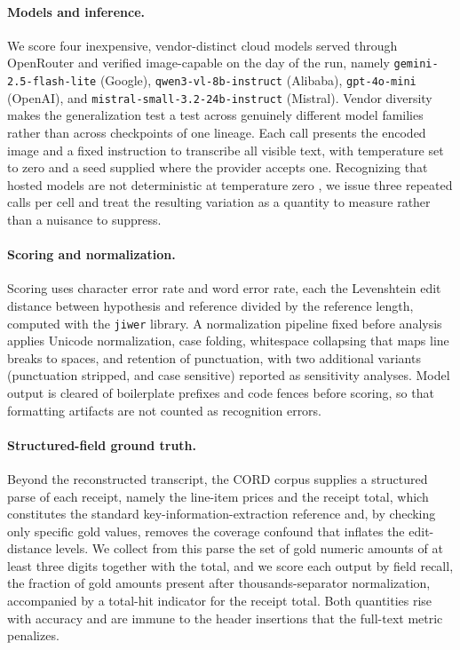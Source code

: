 \documentclass[11pt]{article}
\begin{document}
\paragraph{Models and inference.}
We score four inexpensive, vendor-distinct cloud models served through OpenRouter and verified
image-capable on the day of the run, namely \texttt{gemini-2.5-flash-lite} (Google),
\texttt{qwen3-vl-8b-instruct} (Alibaba), \texttt{gpt-4o-mini} (OpenAI), and
\texttt{mistral-small-3.2-24b-instruct} (Mistral). Vendor diversity makes the generalization test a
test across genuinely different model families rather than across checkpoints of one lineage. Each
call presents the encoded image and a fixed instruction to transcribe all visible text, with
temperature set to zero and a seed supplied where the provider accepts one. Recognizing that hosted
models are not deterministic at temperature zero \citep{atil2024nondeterminism}, we issue three
repeated calls per cell and treat the resulting variation as a quantity to measure rather than a
nuisance to suppress.

\paragraph{Scoring and normalization.}
Scoring uses character error rate and word error rate, each the Levenshtein edit distance between
hypothesis and reference divided by the reference length, computed with the \texttt{jiwer} library.
A normalization pipeline fixed before analysis applies Unicode normalization, case folding,
whitespace collapsing that maps line breaks to spaces, and retention of punctuation, with two
additional variants (punctuation stripped, and case sensitive) reported as sensitivity analyses.
Model output is cleared of boilerplate prefixes and code fences before scoring, so that formatting
artifacts are not counted as recognition errors.

\paragraph{Structured-field ground truth.}
Beyond the reconstructed transcript, the CORD corpus supplies a structured parse of each receipt,
namely the line-item prices and the receipt total, which constitutes the standard
key-information-extraction reference and, by checking only specific gold values, removes the coverage
confound that inflates the edit-distance levels. We collect from this parse the set of gold numeric
amounts of at least three digits together with the total, and we score each output by field recall,
the fraction of gold amounts present after thousands-separator normalization, accompanied by a
total-hit indicator for the receipt total. Both quantities rise with accuracy and are immune to the
header insertions that the full-text metric penalizes.
\end{document}
